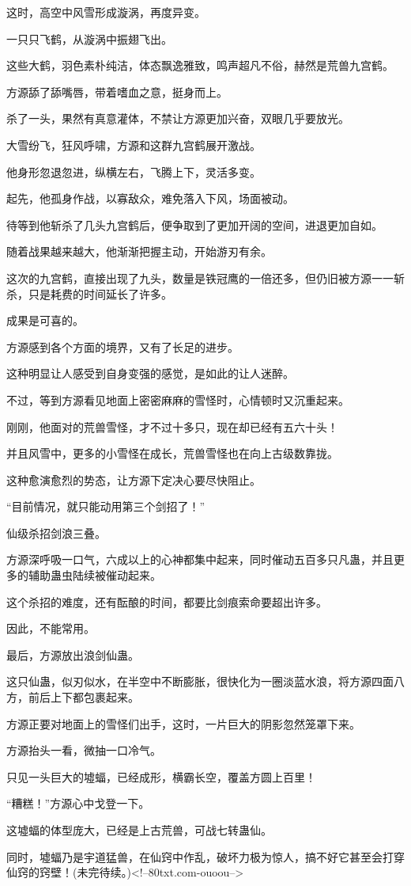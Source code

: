 \begin{this_body}
这时，高空中风雪形成漩涡，再度异变。

一只只飞鹤，从漩涡中振翅飞出。

这些大鹤，羽色素朴纯洁，体态飘逸雅致，鸣声超凡不俗，赫然是荒兽九宫鹤。

方源舔了舔嘴唇，带着嗜血之意，挺身而上。

杀了一头，果然有真意灌体，不禁让方源更加兴奋，双眼几乎要放光。

大雪纷飞，狂风呼啸，方源和这群九宫鹤展开激战。

他身形忽退忽进，纵横左右，飞腾上下，灵活多变。

起先，他孤身作战，以寡敌众，难免落入下风，场面被动。

待等到他斩杀了几头九宫鹤后，便争取到了更加开阔的空间，进退更加自如。

随着战果越来越大，他渐渐把握主动，开始游刃有余。

这次的九宫鹤，直接出现了九头，数量是铁冠鹰的一倍还多，但仍旧被方源一一斩杀，只是耗费的时间延长了许多。

成果是可喜的。

方源感到各个方面的境界，又有了长足的进步。

这种明显让人感受到自身变强的感觉，是如此的让人迷醉。

不过，等到方源看见地面上密密麻麻的雪怪时，心情顿时又沉重起来。

刚刚，他面对的荒兽雪怪，才不过十多只，现在却已经有五六十头！

并且风雪中，更多的小雪怪在成长，荒兽雪怪也在向上古级数靠拢。

这种愈演愈烈的势态，让方源下定决心要尽快阻止。

“目前情况，就只能动用第三个剑招了！”

仙级杀招剑浪三叠。

方源深呼吸一口气，六成以上的心神都集中起来，同时催动五百多只凡蛊，并且更多的辅助蛊虫陆续被催动起来。

这个杀招的难度，还有酝酿的时间，都要比剑痕索命要超出许多。

因此，不能常用。

最后，方源放出浪剑仙蛊。

这只仙蛊，似刃似水，在半空中不断膨胀，很快化为一圈淡蓝水浪，将方源四面八方，前后上下都包裹起来。

方源正要对地面上的雪怪们出手，这时，一片巨大的阴影忽然笼罩下来。

方源抬头一看，微抽一口冷气。

只见一头巨大的墟蝠，已经成形，横霸长空，覆盖方圆上百里！

“糟糕！”方源心中戈登一下。

这墟蝠的体型庞大，已经是上古荒兽，可战七转蛊仙。

同时，墟蝠乃是宇道猛兽，在仙窍中作乱，破坏力极为惊人，搞不好它甚至会打穿仙窍的窍壁！(未完待续。)<!--80txt.com-ouoou-->

\end{this_body}

